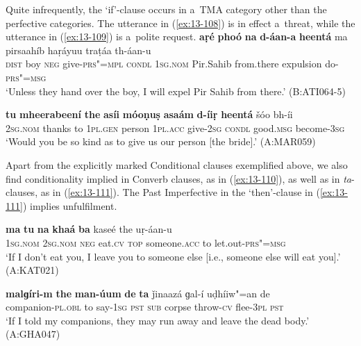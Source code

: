 Quite infrequently, the `if'-clause occurs in a~TMA category other than the perfective categories. The utterance in (\ref{ex:13-108}) is in effect a~threat, while the utterance in (\ref{ex:13-109}) is a~polite request.
\ea
\label{ex:13-108}
\gll \textbf{aṛé} \textbf{phoó} \textbf{na} \textbf{d-áan-a} \textbf{heentá} ma pirsaahíb haṛáyuu traṭáa th-áan-u\\
 \textsc{dist}{\protect\footnotemark} boy \textsc{neg} give-\textsc{prs"=mpl} \textsc{condl} \textsc{1sg.nom} Pir.Sahib from.there expulsion do-\textsc{prs"=msg}\\
\glt `Unless they hand over the boy, I will expel Pir Sahib from there.' (B:ATI064-5)

\ex
\label{ex:13-109}
\gll \textbf{tu} \textbf{mheerabeení} \textbf{the} \textbf{asíi} \textbf{móoṇuṣ} \textbf{asaám} \textbf{d-íiṛ} \textbf{ heentá} šóo bh-íi  \\
\textsc{2sg.nom} thanks to \textsc{1pl.gen} person \textsc{1pl.acc} give-\textsc{2sg}  \textsc{condl} good.\textsc{msg} become-\textsc{3sg} \\
\glt `Would you be so kind as to give us our person [the bride].' (A:MAR059) 
\z



Apart from the explicitly marked Conditional clauses exemplified above, we also find conditionality implied in Converb clauses, as in (\ref{ex:13-110}), as well as in \textit{ta}-clauses, as in (\ref{ex:13-111}). The Past Imperfective in the `then'-clause in (\ref{ex:13-111}) implies unfulfilment.

\begin{exe}
\ex
\label{ex:13-110}
\gll \textbf{ma} \textbf{tu} \textbf{na} \textbf{khaá} \textbf{ba} kaseé the uṛ-áan-u\\
\textsc{1sg.nom} \textsc{2sg.nom} \textsc{neg} eat.\textsc{cv} \textsc{top} someone.\textsc{acc} to let.out-\textsc{prs"=msg}\\
\glt `If I don't eat you, I leave you to someone else [i.e., someone else will eat you].' (A:KAT021)

\ex
\label{ex:13-111}
\gll \label{bkm:Ref190830313}\textbf{malɡíri-m} \textbf{the} \textbf{man-úum} \textbf{de} \textbf{ta} ǰinaazá  ɡal-í uḍhíiw"=an de\\
companion-\textsc{pl.obl} to say-\textsc{1sg} \textsc{ pst} \textsc{sub} corpse throw-\textsc{cv} flee-\textsc{3pl} \textsc{ pst}\\
\glt `If I told my companions, they may run away and leave the dead body.' (A:GHA047) 
\end{exe}

